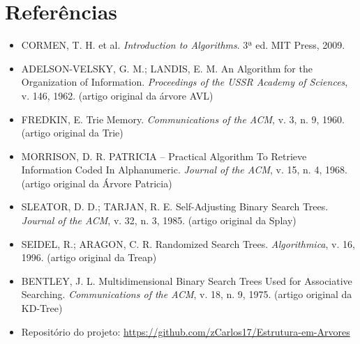 \documentclass[11pt]{article}
\begin{document}
\section*{Referências}
\begin{itemize}
    \item CORMEN, T. H. et al. \textit{Introduction to Algorithms}. 3ª ed. MIT Press, 2009.
    \item ADELSON-VELSKY, G. M.; LANDIS, E. M. An Algorithm for the Organization
    of Information. \textit{Proceedings of the USSR Academy of Sciences}, v. 146, 1962.
    (artigo original da árvore AVL)
    \item FREDKIN, E. Trie Memory. \textit{Communications of the ACM}, v. 3, n. 9, 1960.
    (artigo original da Trie)
    \item MORRISON, D. R. PATRICIA -- Practical Algorithm To Retrieve
    Information Coded In Alphanumeric. \textit{Journal of the ACM}, v. 15, n. 4, 1968.
    (artigo original da Árvore Patricia)
    \item SLEATOR, D. D.; TARJAN, R. E. Self-Adjusting Binary Search Trees.
    \textit{Journal of the ACM}, v. 32, n. 3, 1985. (artigo original da Splay)
    \item SEIDEL, R.; ARAGON, C. R. Randomized Search Trees. \textit{Algorithmica},
    v. 16, 1996. (artigo original da Treap)
    \item BENTLEY, J. L. Multidimensional Binary Search Trees Used for Associative
    Searching. \textit{Communications of the ACM}, v. 18, n. 9, 1975.
    (artigo original da KD-Tree)
    \item Repositório do projeto: \url{https://github.com/zCarlos17/Estrutura-em-Arvores}
\end{itemize}
\end{document}
